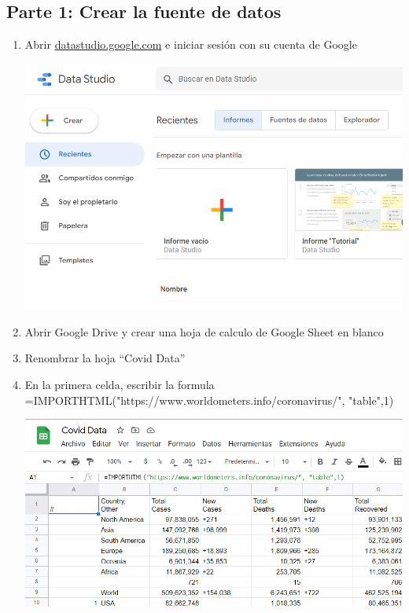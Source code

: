 \documentclass[12pt,letterpaper]{article}
\newcommand\tab[1][1cm]{\hspace*{#1}}
\begin{document}
    \subsection{Parte 1: Crear la fuente de datos}
    \begin{enumerate}[\tab 1.]
        \item Abrir \textcolor{azul}{\url{datastudio.google.com}} e iniciar sesión con su cuenta de Google\\[0.1in]
        \begin{center}
            \includegraphics[width=13cm]{./img/img1.png}
        \end{center}
        \item Abrir Google Drive y crear una hoja de calculo de Google Sheet en blanco
        \item Renombrar la hoja “Covid Data”
        \item En la primera celda, escribir la formula \\
        =IMPORTHTML("https://www.worldometers.info/coronavirus/", "table",1)
        \begin{center}
            \includegraphics[width=13cm]{./img/img2.png}
        \end{center}
    \end{enumerate}
\end{document}
